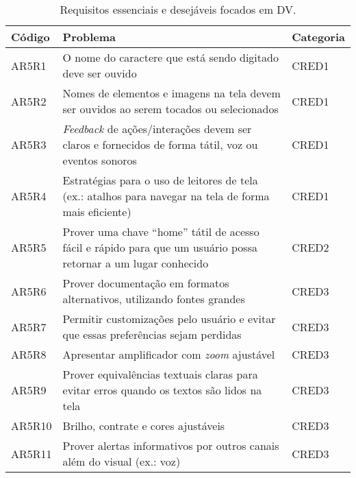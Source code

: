 \begin{table}[htb]
  \begin{center}
    \ABNTEXfontereduzida
    \caption{Requisitos essenciais e desejáveis focados em DV.}
    \label{tab-req-ess-des-1}
    \begin{tabular}{p{1.2cm}|p{12.1cm}|p{1.4cm}}
      \textbf{Código} & \textbf{Problema}                                                                                                & \textbf{Categoria} \\
      \hline
      AR5R1           & O nome do caractere que está sendo digitado deve ser ouvido                                                      & CRED1              \\
      \hline
      AR5R2           & Nomes de elementos e imagens na tela devem ser ouvidos ao serem tocados ou selecionados                          & CRED1              \\
      \hline
      AR5R3           & \emph{Feedback} de ações/interações devem ser claros e fornecidos de forma tátil, voz ou eventos sonoros         & CRED1              \\
      \hline
      AR5R4           & Estratégias para o uso de leitores de tela (ex.\@: atalhos para navegar na tela de forma mais eficiente)         & CRED1              \\
      \hline
      AR5R5           & Prover uma chave ``home'' tátil de acesso fácil e rápido para que um usuário possa retornar a um lugar conhecido & CRED2              \\
      \hline
      AR5R6           & Prover documentação em formatos alternativos, utilizando fontes grandes                                          & CRED3              \\
      \hline
      AR5R7           & Permitir customizações pelo usuário e evitar que essas preferências sejam perdidas                               & CRED3              \\
      \hline
      AR5R8           & Apresentar amplificador com \emph{zoom} ajustável                                                                & CRED3              \\
      \hline
      AR5R9           & Prover equivalências textuais claras para evitar erros quando os textos são lidos na tela                        & CRED3              \\
      \hline
      AR5R10          & Brilho, contrate e cores ajustáveis                                                                              & CRED3              \\
      \hline
      AR5R11          & Prover alertas informativos por outros canais além do visual (ex.\@: voz)                                        & CRED3              \\
    \end{tabular}
  \end{center}
\end{table}

